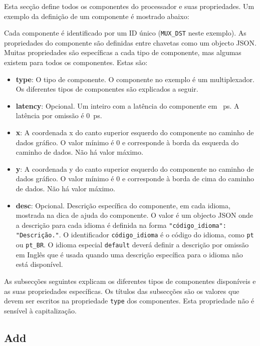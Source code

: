 \documentclass[11pt,a4paper,twoside,titlepage]{report}
\begin{document}
Esta secção define todos os componentes do processador e suas propriedades.
Um exemplo da definição de um componente é mostrado abaixo:



Cada componente é identificado por um ID único (\verb+MUX_DST+ neste exemplo).
As propriedades do componente são definidas entre chavetas como um objecto
JSON. Muitas propriedades são específicas a cada tipo de componente, mas
algumas existem para todos os componentes. Estas são:

\begin{itemize}
	\item \textbf{type}: O tipo de componente. O componente no exemplo é um
		multiplexador. Os diferentes tipos de componentes são explicados a seguir.
	\item \textbf{latency}: Opcional. Um inteiro com a latência do componente em
		\SI{}{\pico\second}. A latência por omissão é \SI{0}{\pico\second}.
	\item \textbf{x}: A coordenada x do canto superior esquerdo do componente no
		caminho de dados gráfico. O valor mínimo é 0 e corresponde à borda da
		esquerda do caminho de dados. Não há valor máximo.
	\item \textbf{y}: A coordenada y do canto superior esquerdo do componente no
		caminho de dados gráfico. O valor mínimo é 0 e corresponde à borda de
		cima do caminho de dados. Não há valor máximo.
	\item \textbf{desc}: Opcional. Descrição específica do componente, em cada
		idioma, mostrada na dica de ajuda do componente.
		O valor é um objecto JSON onde a descrição para cada idioma é definida na
		forma \verb+"código_idioma": "Descrição."+. O identificador
		\verb+código_idioma+ é o código do idioma, como \verb+pt+ ou \verb+pt_BR+.
		O idioma especial \verb+default+ deverá definir a descrição por omissão em
		Inglês que é usada quando uma descrição específica para o idioma não está
		disponível.
\end{itemize}

As subsecções seguintes explicam os diferentes tipos de componentes disponíveis
e as suas propriedades específicas.
Os títulos das subsecções são os valores que devem ser escritos na propriedade
\verb+type+ dos componentes. Esta propriedade não é sensível à capitalização.

\subsection{Add}
\end{document}

